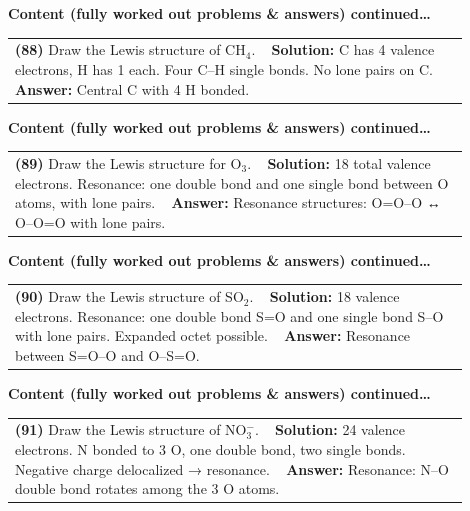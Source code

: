 \documentclass{article}
\begin{document}
{\newpage
\noindent
{\large\textbf{Content (fully worked out problems & answers) continued…}}\\[0.2em]
\begin{tabular}{|p{0.9\linewidth}|}
\hline
\vspace{0.2cm}
\textbf{(88)} Draw the Lewis structure of CH$_4$. \
\hline
\vspace{0.2cm}
\textbf{Solution:} C has 4 valence electrons, H has 1 each. Four C–H single bonds. No lone pairs on C. \
\hline
\vspace{0.2cm}
\textbf{Answer:} Central C with 4 H bonded. \
\hline
\end{tabular}

\newpage
\noindent
{\large\textbf{Content (fully worked out problems & answers) continued…}}\\[0.2em]
\begin{tabular}{|p{0.9\linewidth}|}
\hline
\vspace{0.2cm}
\textbf{(89)} Draw the Lewis structure for O$_3$. \
\hline
\vspace{0.2cm}
\textbf{Solution:} 18 total valence electrons. Resonance: one double bond and one single bond between O atoms, with lone pairs. \
\hline
\vspace{0.2cm}
\textbf{Answer:} Resonance structures: O=O–O ↔ O–O=O with lone pairs. \
\hline
\end{tabular}

\newpage
\noindent
{\large\textbf{Content (fully worked out problems & answers) continued…}}\\[0.2em]
\begin{tabular}{|p{0.9\linewidth}|}
\hline
\vspace{0.2cm}
\textbf{(90)} Draw the Lewis structure of SO$_2$. \
\hline
\vspace{0.2cm}
\textbf{Solution:} 18 valence electrons. Resonance: one double bond S=O and one single bond S–O with lone pairs. Expanded octet possible. \
\hline
\vspace{0.2cm}
\textbf{Answer:} Resonance between S=O–O and O–S=O. \
\hline
\end{tabular}

\newpage
\noindent
{\large\textbf{Content (fully worked out problems & answers) continued…}}\\[0.2em]
\begin{tabular}{|p{0.9\linewidth}|}
\hline
\vspace{0.2cm}
\textbf{(91)} Draw the Lewis structure of NO$_3^-$. \
\hline
\vspace{0.2cm}
\textbf{Solution:} 24 valence electrons. N bonded to 3 O, one double bond, two single bonds. Negative charge delocalized → resonance. \
\hline
\vspace{0.2cm}
\textbf{Answer:} Resonance: N–O double bond rotates among the 3 O atoms. \
\hline
\end{tabular}

}
\end{document}
